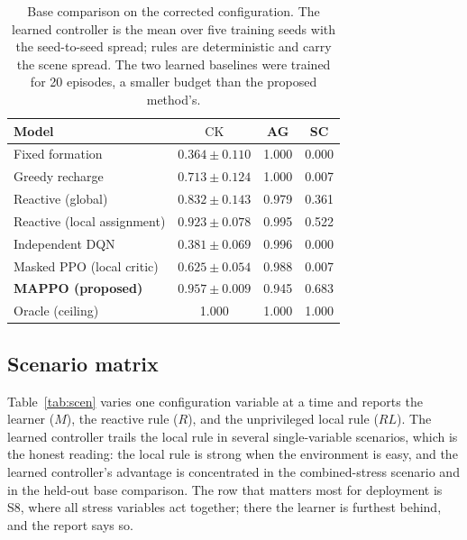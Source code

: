 \documentclass[conference]{IEEEtran}
\newcommand{\ck}{\mathrm{CK}}
\begin{document}
\begin{table}[t]
\caption{Base comparison on the corrected configuration. The learned controller is the mean over five training seeds with the seed-to-seed spread; rules are deterministic and carry the scene spread. The two learned baselines were trained for 20 episodes, a smaller budget than the proposed method's.}
\label{tab:base}
\centering
\small
\setlength{\tabcolsep}{3pt}
\begin{tabular}{@{}lccc@{}}
\toprule
Model & $\ck$ & AG & SC \\
\midrule
Fixed formation & $0.364\pm0.110$ & 1.000 & 0.000 \\
Greedy recharge & $0.713\pm0.124$ & 1.000 & 0.007 \\
Reactive (global) & $0.832\pm0.143$ & 0.979 & 0.361 \\
Reactive (local assignment) & $0.923\pm0.078$ & 0.995 & 0.522 \\
Independent DQN & $0.381\pm0.069$ & 0.996 & 0.000 \\
Masked PPO (local critic) & $0.625\pm0.054$ & 0.988 & 0.007 \\
\textbf{MAPPO (proposed)} & $\mathbf{0.957\pm0.009}$ & 0.945 & 0.683 \\
Oracle (ceiling) & 1.000 & 1.000 & 1.000 \\
\bottomrule
\end{tabular}
\end{table}

\subsection{Scenario matrix}
Table~\ref{tab:scen} varies one configuration variable at a time and reports the learner ($M$), the reactive rule ($R$), and the unprivileged local rule ($RL$). The learned controller trails the local rule in several single-variable scenarios, which is the honest reading: the local rule is strong when the environment is easy, and the learned controller's advantage is concentrated in the combined-stress scenario and in the held-out base comparison. The row that matters most for deployment is S8, where all stress variables act together; there the learner is furthest behind, and the report says so.
\end{document}
